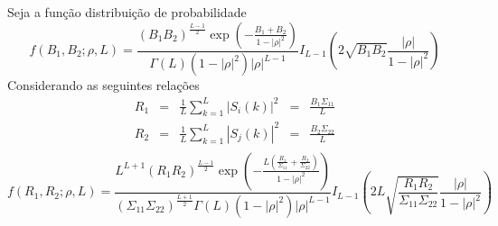 Seja a função distribuição de probabilidade 
\begin{equation}\label{func_biv_produto_inten_b1_b2}
	f(B_1,B_2;\rho, L)=\frac{\left(B_1B_2\right)^{\frac{L-1}{2}}\exp\left(-\frac{B_1+B_2}{1-|\rho|^2}\right)}{\Gamma(L)(1-|\rho|^2)|\rho|^{L-1}}I_{L-1}\left(2\sqrt{B_1B_2}\frac{|\rho|}{1-|\rho|^2}\right)
\end{equation}
Considerando as seguintes relações 
\begin{equation}\label{eqn59}
\begin{array}{ccccc}
	R_1&=&\frac{1}{L}\sum_{k=1}^{L}|S_i(k)|^2&=&\frac{B_1\Sigma_{11}}{L}\\
	R_2&=&\frac{1}{L}\sum_{k=1}^{L}|S_j(k)|^2&=&\frac{B_2\Sigma_{22}}{L}\\
\end{array}
\end{equation}
\begin{equation}\label{fun_pdf_biv_inten}
	f(R_1,R_2;\rho,L)=\frac{L^{L+1}\left(R_1R_2\right)^{\frac{L-1}{2}}\exp\left(-\frac{L(\frac{R_1}{\Sigma_{11}}+\frac{R_2}{\Sigma_{22}})}{1-|\rho|^2}\right)}{(\Sigma_{11}\Sigma_{22})^{\frac{L+1}{2}}\Gamma(L)(1-|\rho|^2)|\rho|^{L-1}}I_{L-1}\left(2L\sqrt{\frac{R_1R_2}{\Sigma_{11}\Sigma_{22}}}\frac{|\rho|}{1-|\rho|^2}\right)
\end{equation}


